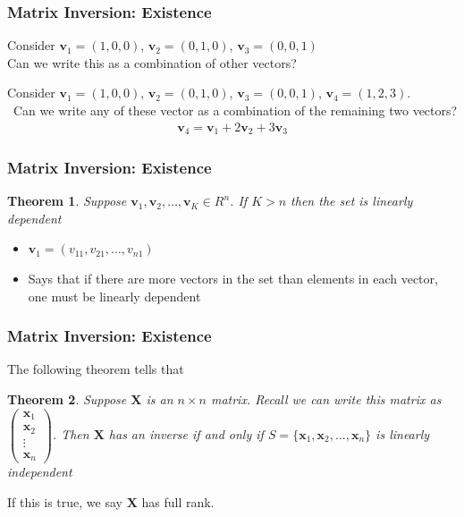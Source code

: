 \documentclass[handout]{beamer}
\newtheorem{thm}{Theorem}
\numberwithin{equation}{section}
\begin{document}
\begin{frame}
\frametitle{Matrix Inversion: Existence}

Consider $\boldsymbol{v}_{1} = (1, 0, 0)$, $\boldsymbol{v}_{2} = (0,1,0)$, $\boldsymbol{v}_{3} = (0,0,1)$ \\
Can we write this as a combination of other vectors?  \pause {}\pause 

Consider $\boldsymbol{v}_{1} = (1, 0, 0)$, $\boldsymbol{v}_{2} = (0,1,0)$, $\boldsymbol{v}_{3} = (0,0,1)$, $\boldsymbol{v}_{4} = (1, 2, 3)$.  \\\
Can we write any of these vector as a combination of the remaining two vectors?  \\ \pause 
\begin{eqnarray}
\boldsymbol{v}_{4} = \boldsymbol{v}_{1} + 2 \boldsymbol{v}_{2} + 3\boldsymbol{v}_{3} \nonumber  
\end{eqnarray}

\end{frame}


\begin{frame}
\frametitle{Matrix Inversion: Existence} 

\begin{thm} 
Suppose $\boldsymbol{v}_{1}, \boldsymbol{v}_2, \hdots, \boldsymbol{v}_{K} \in R^{n}$.  If $K>n$ then the set is linearly dependent 
\end{thm}
\pause 
\begin{itemize}
\item[-] $\boldsymbol{v}_{1} = (v_{11}, v_{21}, \hdots, v_{n1})$ \pause 
\item[-] Says that if there are more vectors in the set than elements in each vector, one must be linearly dependent 
\end{itemize}

\end{frame}



\begin{frame}
\frametitle{Matrix Inversion: Existence}

The following theorem tells that 

\begin{thm} Suppose $\boldsymbol{X} $ is an $n \times n$ matrix.  Recall we can write this matrix as 
$\begin{pmatrix} \boldsymbol{x}_{1} \\ \boldsymbol{x}_{2} \\ \vdots \\ \boldsymbol{x}_{n} \end{pmatrix}$.  Then $\boldsymbol{X}$ has an inverse if and only if $S = \{\boldsymbol{x}_{1} , \boldsymbol{x}_{2} ,  \hdots, \boldsymbol{x}_{n} \}$ is linearly independent 
\end{thm} \pause

If this is true, we say $\boldsymbol{X}$ has full rank.

\end{frame}
\end{document}
